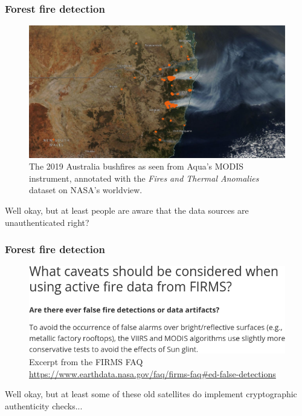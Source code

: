 \documentclass{beamer}
\begin{document}
\begin{frame}
  \frametitle{Forest fire detection}
  \begin{figure}
      \centering
      \includegraphics[width=\columnwidth]{images/bushfire.png}
      \caption{The 2019 Australia bushfires as seen from Aqua's MODIS instrument, annotated with the \textit{Fires and Thermal Anomalies} dataset on NASA's worldview.\protect\footnotemark}
      \label{fig:bushfire}
  \end{figure}

  Well okay, but at least people are aware that the data sources are unauthenticated right?
\end{frame}

\begin{frame}
  \frametitle{Forest fire detection}
  \begin{figure}
      \includegraphics[width=\columnwidth]{images/firms_faq.png}
      \caption{Excerpt from the FIRMS FAQ \url{https://www.earthdata.nasa.gov/faq/firms-faq\#ed-false-detections}}
      \label{fig:bushfire}
  \end{figure}

  Well okay, but at least some of these old satellites do implement cryptographic authenticity checks...
\end{frame}



\end{document}
